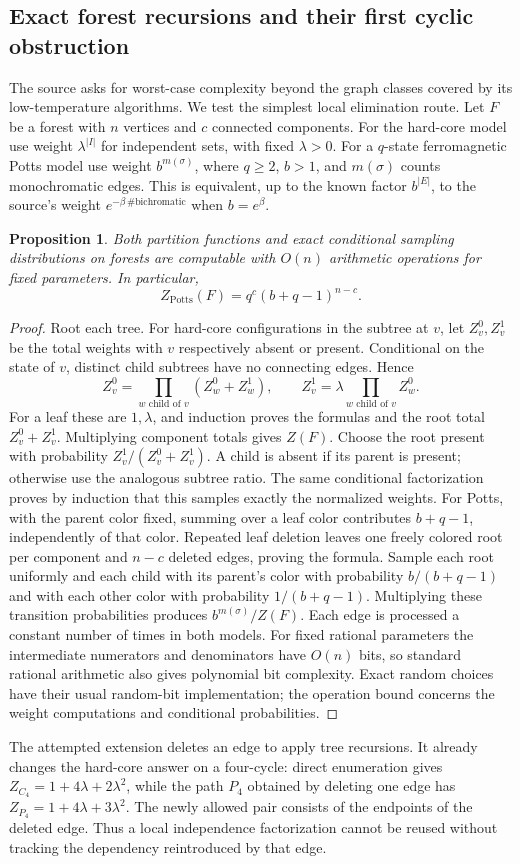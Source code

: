 \documentclass[11pt]{article}
\newtheorem{proposition}{Proposition}
\begin{document}
\subsection{Exact forest recursions and their first cyclic obstruction}
The source asks for worst-case complexity beyond the graph classes covered by its low-temperature algorithms. We test the simplest local elimination route. Let $F$ be a forest with $n$ vertices and $c$ connected components. For the hard-core model use weight $\lambda^{|I|}$ for independent sets, with fixed $\lambda>0$. For a $q$-state ferromagnetic Potts model use weight $b^{m(\sigma)}$, where $q\ge2$, $b>1$, and $m(\sigma)$ counts monochromatic edges. This is equivalent, up to the known factor $b^{|E|}$, to the source's weight $e^{-\beta\,\#\text{bichromatic}}$ when $b=e^\beta$.
\begin{proposition}
Both partition functions and exact conditional sampling distributions on forests are computable with $O(n)$ arithmetic operations for fixed parameters. In particular,
\[
Z_{\mathrm{Potts}}(F)=q^c(b+q-1)^{n-c}.
\]
\end{proposition}
\begin{proof}
Root each tree. For hard-core configurations in the subtree at $v$, let $Z_v^0,Z_v^1$ be the total weights with $v$ respectively absent or present. Conditional on the state of $v$, distinct child subtrees have no connecting edges. Hence
\[
Z_v^0=\prod_{w\text{ child of }v}(Z_w^0+Z_w^1),\qquad
Z_v^1=\lambda\prod_{w\text{ child of }v}Z_w^0.
\]
For a leaf these are $1,\lambda$, and induction proves the formulas and the root total $Z_v^0+Z_v^1$. Multiplying component totals gives $Z(F)$. Choose the root present with probability $Z_v^1/(Z_v^0+Z_v^1)$. A child is absent if its parent is present; otherwise use the analogous subtree ratio. The same conditional factorization proves by induction that this samples exactly the normalized weights.
For Potts, with the parent color fixed, summing over a leaf color contributes $b+q-1$, independently of that color. Repeated leaf deletion leaves one freely colored root per component and $n-c$ deleted edges, proving the formula. Sample each root uniformly and each child with its parent's color with probability $b/(b+q-1)$ and with each other color with probability $1/(b+q-1)$. Multiplying these transition probabilities produces $b^{m(\sigma)}/Z(F)$. Each edge is processed a constant number of times in both models. For fixed rational parameters the intermediate numerators and denominators have $O(n)$ bits, so standard rational arithmetic also gives polynomial bit complexity. Exact random choices have their usual random-bit implementation; the operation bound concerns the weight computations and conditional probabilities.
\end{proof}
The attempted extension deletes an edge to apply tree recursions. It already changes the hard-core answer on a four-cycle: direct enumeration gives $Z_{C_4}=1+4\lambda+2\lambda^2$, while the path $P_4$ obtained by deleting one edge has $Z_{P_4}=1+4\lambda+3\lambda^2$. The newly allowed pair consists of the endpoints of the deleted edge. Thus a local independence factorization cannot be reused without tracking the dependency reintroduced by that edge.
\end{document}
